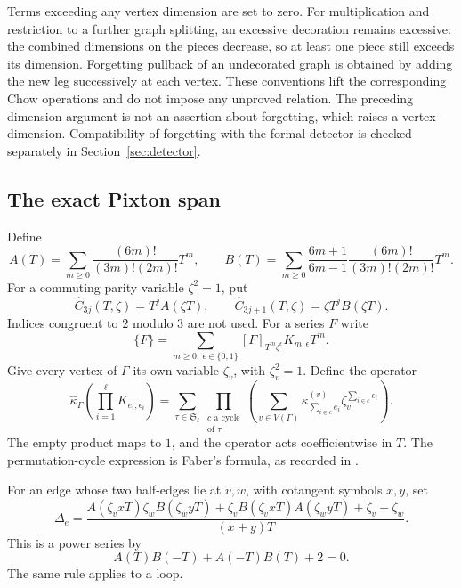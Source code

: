 Terms exceeding any vertex dimension are set to zero. For multiplication
and restriction to a further graph splitting, an excessive decoration
remains excessive: the combined dimensions on the pieces decrease,
so at least one piece still exceeds its dimension.
Forgetting pullback of an undecorated graph is obtained by adding
the new leg successively at each vertex. These conventions lift the
corresponding Chow operations and do not impose any unproved relation.
The preceding dimension argument is not an assertion about forgetting,
which raises a vertex dimension. Compatibility of forgetting with the
formal detector is checked separately in Section~\ref{sec:detector}.

\subsection{The exact Pixton span}

Define
\[
A(T)=\sum_{m\geq0}\frac{(6m)!}{(3m)!(2m)!}T^m,\qquad
B(T)=\sum_{m\geq0}
\frac{6m+1}{6m-1}\frac{(6m)!}{(3m)!(2m)!}T^m.
\]
For a commuting parity variable \(\zeta^2=1\), put
\[
\widehat C_{3j}(T,\zeta)=T^jA(\zeta T),\qquad
\widehat C_{3j+1}(T,\zeta)=\zeta T^jB(\zeta T).
\]
Indices congruent to \(2\) modulo \(3\) are not used. For a series \(F\)
write
\[
\{F\}=\sum_{m\geq0,\ \epsilon\in\{0,1\}}
[F]_{T^m\zeta^\epsilon}K_{m,\epsilon}T^m.
\]
Give every vertex of \(\Gamma\) its own variable \(\zeta_v\), with
\(\zeta_v^2=1\). Define the operator
\[
\widehat\kappa_\Gamma
\left(\prod_{i=1}^{\ell}K_{e_i,\epsilon_i}\right)
=
\sum_{\tau\in\mathfrak S_\ell}
\prod_{\substack{c\text{ a cycle}\\\text{of }\tau}}
\left(
\sum_{v\in V(\Gamma)}
\kappa^{(v)}_{\sum_{i\in c}e_i}
\zeta_v^{\sum_{i\in c}\epsilon_i}
\right).
\]
The empty product maps to \(1\), and the operator acts coefficientwise
in \(T\). The permutation-cycle expression is Faber's formula, as
recorded in \cite[Equations~(1.12)--(1.13)]{ArbarelloCornalba1996}.

For an edge whose two half-edges lie at \(v,w\), with cotangent symbols
\(x,y\), set
\[
\Delta_e=
\frac{
A(\zeta_vxT)\zeta_wB(\zeta_wyT)
+\zeta_vB(\zeta_vxT)A(\zeta_wyT)
+\zeta_v+\zeta_w
}{(x+y)T}.
\]
This is a power series by
\[
A(T)B(-T)+A(-T)B(T)+2=0.
\]
The same rule applies to a loop.


